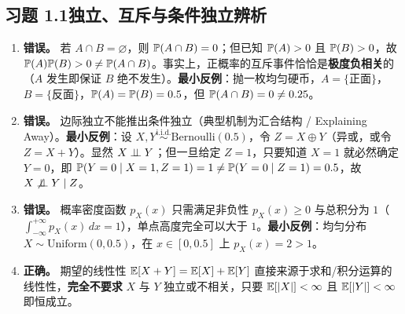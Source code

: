 \subsection*{习题 1.1\quad 独立、互斥与条件独立辨析}
\begin{enumerate}[label=(\alph*), leftmargin=1.8em]
  \item \textbf{错误。} 若 $A \cap B = \varnothing$，则 $\mathbb{P}(A \cap B) = 0$；但已知 $\mathbb{P}(A) > 0$ 且 $\mathbb{P}(B) > 0$，故 $\mathbb{P}(A)\mathbb{P}(B) > 0 \neq \mathbb{P}(A \cap B)$。事实上，正概率的互斥事件恰恰是\textbf{极度负相关}的（$A$ 发生即保证 $B$ 绝不发生）。\textbf{最小反例}：抛一枚均匀硬币，$A = \{\text{正面}\}$，$B = \{\text{反面}\}$，$\mathbb{P}(A)=\mathbb{P}(B)=0.5$，但 $\mathbb{P}(A\cap B)=0 \neq 0.25$。
  \item \textbf{错误。} 边际独立不能推出条件独立（典型机制为汇合结构 / Explaining Away）。\textbf{最小反例}：设 $X, Y \stackrel{\text{i.i.d.}}{\sim} \mathrm{Bernoulli}(0.5)$，令 $Z = X \oplus Y$（异或，或令 $Z = X + Y$）。显然 $X \perp\!\!\!\perp Y$；但一旦给定 $Z = 1$，只要知道 $X = 1$ 就必然确定 $Y = 0$，即 $\mathbb{P}(Y=0 \mid X=1, Z=1) = 1 \neq \mathbb{P}(Y=0 \mid Z=1) = 0.5$，故 $X \not\perp\!\!\!\perp Y \mid Z$。
  \item \textbf{错误。} 概率密度函数 $p_X(x)$ 只需满足非负性 $p_X(x) \ge 0$ 与总积分为 $1$（$\int_{-\infty}^{+\infty} p_X(x)\,dx = 1$），单点高度完全可以大于 $1$。\textbf{最小反例}：均匀分布 $X \sim \mathrm{Uniform}(0, 0.5)$，在 $x \in [0, 0.5]$ 上 $p_X(x) = 2 > 1$。
  \item \textbf{正确。} 期望的线性性 $\mathbb{E}[X + Y] = \mathbb{E}[X] + \mathbb{E}[Y]$ 直接来源于求和/积分运算的线性性，\textbf{完全不要求} $X$ 与 $Y$ 独立或不相关，只要 $\mathbb{E}[|X|] < \infty$ 且 $\mathbb{E}[|Y|] < \infty$ 即恒成立。
\end{enumerate}

